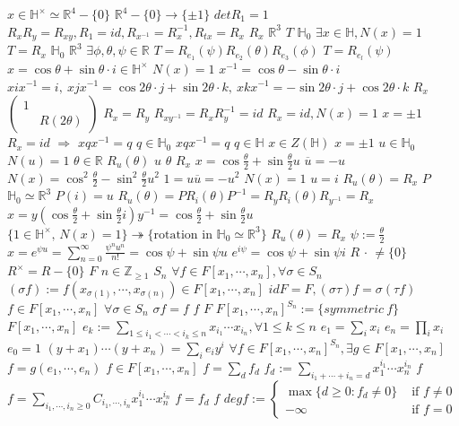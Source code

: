 \documentclass{article}
\begin{document}
$x \in \mathbb{H}^\times \simeq \mathbb{R}^4-\{0\}$
$\mathbb{R}^4-\{0\} \rightarrow \{\pm 1\}$
$detR_1=1$
$R_xR_y=R_{xy},R_1=id,R_{x^{-1}}=R_{x}^{-1},R_{tx}=R_x$
$R_x$
$\mathbb{R}^3$
$T$
$\mathbb{H}_0$
$\exists x \in \mathbb{H},N(x)=1$
$T=R_x$
$\mathbb{H}_0$
$\mathbb{R}^3$
$\exists \phi,\theta,\psi \in \mathbb{R}$
$T=R_{e_1}(\psi)R_{e_2}(\theta)R_{e_3}(\phi)$
$T=R_{e_l}(\psi)$
$x=\cos \theta + \sin \theta \cdot i \in \mathbb{H}^{\times}$
$N(x)=1$
$x^{-1}=\cos\theta-\sin\theta \cdot i$
$xix^{-1}=i,\ xjx^{-1}=\cos2\theta \cdot j+\sin2\theta \cdot k,\ xkx^{-1}=-\sin2\theta \cdot j+\cos2\theta \cdot k$
$R_x$
$\begin{pmatrix}1&\\&R(2\theta)\end{pmatrix}$
$R_x=R_y$
$R_{xy^{-1}}=R_xR_y^{-1}=id$
$R_x=id,N(x)=1$
$x=\pm 1$
$R_x=id$
$\Rightarrow$
$xqx^{-1}=q$
$q \in \mathbb{H}_0$
$xqx^{-1}=q$
$q \in \mathbb{H}$
$x \in Z(\mathbb{H})$
$x=\pm 1$
$u \in \mathbb{H}_0$
$N(u)=1$
$\theta \in \mathbb{R}$
$R_u(\theta)$
$u$
$\theta$
$R_x$
$x=\cos\frac{\theta}{2}+\sin\frac{\theta}{2}u$
$\overline{u}=-u$
$N(x)=\cos^2\frac{\theta}{2}-\sin^2\frac{\theta}{2}u^2$
$1=u\overline{u}=-u^2$
$N(x)=1$
$u=i$
$R_u(\theta)=R_x$
$P$
$\mathbb{H}_0 \simeq \mathbb{R}^3$
$P(i)=u$
$R_u(\theta)=PR_i(\theta)P^{-1}=R_yR_i(\theta)R_{y^{-1}}=R_x$
$x=y(\cos\frac{\theta}{2}+\sin\frac{\theta}{2}i)y^{-1}=\cos\frac{\theta}{2}+\sin\frac{\theta}{2}u$
$\{1 \in \mathbb{H}^\times,\, N(x)=1\} \twoheadrightarrow \{\text{rotation in } \mathbb{H}_0 \simeq \mathbb{R}^3\}$
$R_u(\theta)=R_x$
$\psi:=\frac{\theta}{2}$
$x=e^{\psi u}=\sum_{n=0}^{\infty}\frac{\psi^nu^n}{n!}=\cos\psi+\sin\psi u$
$e^{i\psi}=\cos\psi+\sin\psi i$
$R$
$\cdot$
$\neq \{0\}$
$R^{\times}=R-\{0\}$
$F$
$n \in \mathbb{Z}_{\geq 1}$
$S_n$
$\forall f \in F[x_1, \cdots,x_n], \forall \sigma \in S_n$
$(\sigma f):=f(x_{\sigma(1)},\cdots,x_{\sigma(n)}) \in F[x_1,\cdots,x_n]$
$idF=F,(\sigma\tau) f=\sigma(\tau f)$
$f \in F[x_1,\cdots,x_n]$
$\forall \sigma \in S_n$
$\sigma f=f$
$f$
$F$
$F[x_1, \cdots, x_n]^{S_n}:=\{symmetric \ f\}$
$F[x_1,\cdots,x_n]$
$e_k:=\sum\limits_{1 \leq i_1 < \cdots < i_k \leq n}x_{i_1} \cdots x_{i_n},\forall 1 \leq k \leq n$
$e_1=\sum_i x_i$
$e_n=\prod_ix_i$
$e_0=1$
$(y+x_1) \cdots (y+x_n)=\sum_ie_iy^i$
$\forall f\in F[x_1,\cdots,x_n]^{S_n}, \exists g \in F[x_1,\cdots,x_n]$
$f=g(e_1,\cdots,e_n)$
$f \in F[x_1,\cdots,x_n]$
$f=\sum_df_d$
$f_d:=\sum\limits_{i_1+\cdots+i_n=d}x_1^{i_1}\cdots x_n^{i_n}$
$f$
$f=\sum\limits_{i_1,\cdots,i_n\geq 0}C_{i_1,\cdots,i_n}x_1^{i_1}\cdots x_n^{i_n}$
$f=f_d$
$f$
$degf:=\begin{cases}\max\{d \geq 0:f_d \neq 0\} &\text{ if }f \neq 0\\-\infty &\text{ if } f=0\end{cases}$
\end{document}
